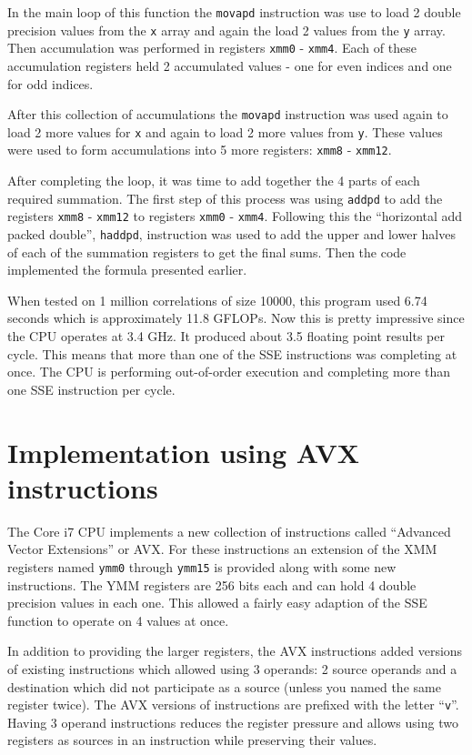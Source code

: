 \documentclass[11pt,b5paper]{book}
\begin{document}
In the main loop of this function the {\tt movapd} instruction was
use to load 2 double precision values from the {\tt x} array and
again the load 2 values from the {\tt y} array.
Then accumulation was performed in registers {\tt xmm0} - {\tt xmm4}.
Each of these accumulation registers held 2 accumulated values - one
for even indices and one for odd indices.

After this collection of accumulations the {\tt movapd} instruction
was used again to load 2 more values for {\tt x} and again to load 2 more
values from {\tt y}.
These values were used to form accumulations into 5 more registers:
{\tt xmm8} - {\tt xmm12}.

After completing the loop, it was time to add together the 4 parts of
each required summation.
The first step of this process was using {\tt addpd} to add the registers
{\tt xmm8} - {\tt xmm12} to registers {\tt xmm0} - {\tt xmm4}.
Following this the ``horizontal add packed double'', {\tt haddpd},
instruction was used to add the upper and lower halves of each of the
summation registers to get the final sums.
Then the code implemented the formula presented earlier.

When tested on 1 million correlations of size 10000, this program used
6.74 seconds which is approximately 11.8 GFLOPs.
Now this is pretty impressive since the CPU operates at 3.4 GHz.
It produced about 3.5 floating point results per cycle.
This means that more than one of the SSE instructions was completing at once.
The CPU is performing out-of-order execution and completing more than
one SSE instruction per cycle.

\section{Implementation using AVX instructions}

The Core i7 CPU implements a new collection of instructions called
``Advanced Vector Extensions'' or AVX.
For these instructions an extension of the XMM registers named {\tt ymm0}
through {\tt ymm15} is provided along with some new instructions.
The YMM registers are 256 bits each and can hold 4 double precision values in
each one.
This allowed a fairly easy adaption of the SSE function to operate on
4 values at once.

In addition to providing the larger registers, the AVX instructions added
versions of existing instructions which allowed using 3 operands: 2 source operands and a destination which did not participate as a source (unless you
named the same register twice).
The AVX versions of instructions are prefixed with the letter ``{\tt v}''.
Having 3 operand instructions reduces the register pressure and allows using
two registers as sources in an instruction while preserving their values.
\end{document}
